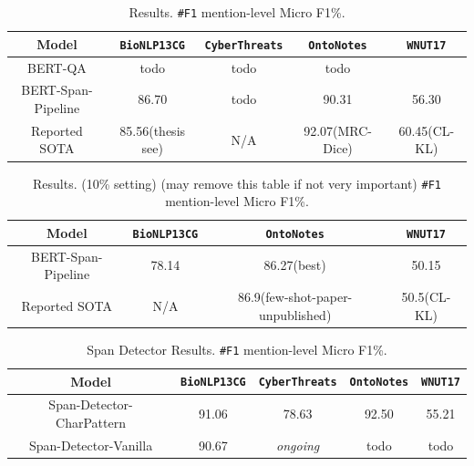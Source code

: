 \begin{table}[h!]
\centering
\begin{small}
\begin{tabular}{ccccc}\toprule
 \textbf{Model} & \texttt{BioNLP13CG} & \texttt{CyberThreats} & \texttt{OntoNotes} & \texttt{WNUT17} \\ \toprule 
BERT-QA & todo & todo & todo  \\
BERT-Span-Pipeline     & 86.70 & todo & 90.31 & 56.30  \\
Reported SOTA & 85.56(thesis see) & N/A & 92.07(MRC-Dice) & 60.45(CL-KL)  \\
\bottomrule
\end{tabular}
\caption{Results. \texttt{\#F1} mention-level Micro F1\%. }
\label{tab:main}
\end{small}
\end{table}

\begin{table}[h!]
\centering
\begin{small}
\begin{tabular}{cccc}\toprule
 \textbf{Model} & \texttt{BioNLP13CG} & \texttt{OntoNotes} & \texttt{WNUT17} \\ \toprule 
BERT-Span-Pipeline     & 78.14 & 86.27(best) & 50.15  \\
Reported SOTA & N/A & 86.9(few-shot-paper-unpublished) & 50.5(CL-KL)  \\
\bottomrule
\end{tabular}
\caption{Results. (10\% setting) (may remove this table if not very important) \texttt{\#F1} mention-level Micro F1\%.}
\label{tab:main}
\end{small}
\end{table}

\begin{table}[h!]
\centering
\begin{small}
\begin{tabular}{ccccc}\toprule
 \textbf{Model} & \texttt{BioNLP13CG} & \texttt{CyberThreats} & \texttt{OntoNotes} & \texttt{WNUT17} \\ \toprule 
Span-Detector-CharPattern & 91.06 & 78.63 & 92.50 & 55.21  \\
Span-Detector-Vanilla     & 90.67 & \textit{ongoing} & todo & todo  \\
\bottomrule
\end{tabular}
\caption{Span Detector Results. \texttt{\#F1} mention-level Micro F1\%. }
\label{tab:det_ablation}
\end{small}
\end{table}

